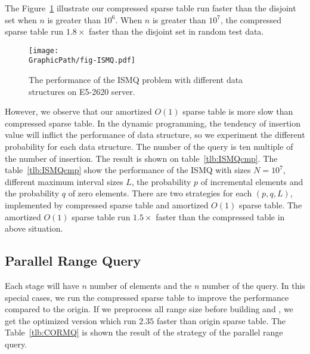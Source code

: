 The Figure~\ref{fig:fig-ISMQcmp} illustrate our compressed sparse table
run faster than the disjoint set when $n$ is greater than  $10^6$.  When
$n$ is greater than $10^7$, the compressed sparse table run $1.8 \times$
faster than the disjoint set in random test data.

\begin{figure}[!thb]
  \centering
  \texttt{[image: \\GraphicPath/fig-ISMQ.pdf]}
  \caption{
  The performance of the ISMQ problem with different data structures on 
  E5-2620 server.
  }
  \label{fig:fig-ISMQcmp}
\end{figure}

However, we observe that our amortized $O(1)$ sparse table is more
slow than compressed sparse table.  In the dynamic programming, the
tendency of insertion value will inflict the performance of data
structure, so we experiment the different probability for each data
structure.  The number of the query is ten multiple of the number of
insertion.  The result is shown on table~\ref{tlb:ISMQcmp}.  The
table~\ref{tlb:ISMQcmp} show the performance of the ISMQ with sizes $N
= 10^7$, different maximum interval sizes $L$, the probability $p$ of
incremental elements and the probability $q$ of zero elements. There
are two strategies for each $(p, q, L)$, implemented by compressed
sparse table and amortized $O(1)$ sparse table.  The amortized $O(1)$
sparse table run $1.5 \times$ faster than the compressed table in
above situation.

\iffalse 當運行 $n > 10^6$ 時，我們提出的壓縮稀疏表的效能已經勝過并查
集的版本，其運行結果如圖表 ~\ref{fig:fig-ISMQcmp}。在 $n = 10^7$ 時，
加速 $1.25 \times$。然而，我們提供的 amortized $\theta(1)$ 的稀疏表慢
於并查集，我們做了深入的機率探討 (參照表 ~\ref{tlb:ISMQcmp})，由於大部
分的操作都被區塊後綴和前綴解決，沒有實際運用到內部詢問，約束區間詢問的
大小為 $L$，在 $N = 10^7$ 時，最多能加速 $1.26 \times$，其中插入和詢問
比例為 1:10，當詢問比重更大時，將有更明顯的加速。\fi



\subsection{Parallel Range Query}

Each stage will have $n$ number of elements and the $n$ number of the
query.  In this special cases, we run the compressed sparse table to
improve the performance compared to the origin.  If we preprocess all
range size before building and , we get the optimized version which run
$2.35$ faster than origin sparse table.  The Table~\ref{tlb:CORMQ} is
shown the result of the strategy of the parallel range query.

\iffalse 每一次有 $n$ 個元素和 $n$ 組詢問，針對這種特殊性質的問題，我
們運行樸素的 \texttt{CORMQ} (compressed RMQ) 得到效能改善，搭配可預測
的分析降低運算量 (參照 \texttt{CORMQ-opt})，得到更好的改善。在
\texttt{CORMQ-opt} 策略中，得到 $2.35 \times$ 倍的加速，結果如表
~\ref{tlb:CORMQ}。\fi


